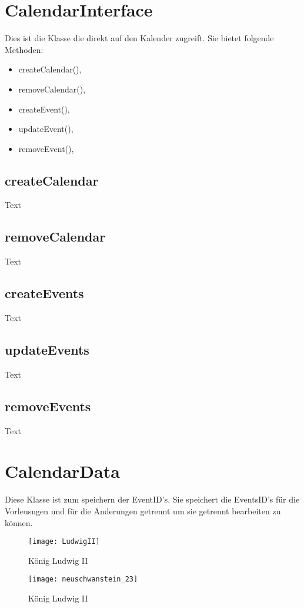 \section{CalendarInterface}
Dies ist die Klasse die direkt auf den Kalender zugreift. Sie bietet folgende Methoden:
\begin{itemize}
     \item createCalendar(),
     \item removeCalendar(),
     \item createEvent(),
     \item updateEvent(),
     \item removeEvent(),
\end{itemize}

\subsection{createCalendar}
Text

\subsection{removeCalendar}
Text

\subsection{createEvents}
Text

\subsection{updateEvents}
Text

\subsection{removeEvents}
Text

\section{CalendarData}
Diese Klasse ist zum speichern der EventID's. Sie speichert die EventsID's für die Vorleusngen und für die Änderungen getrennt um sie getrennt bearbeiten zu können.





\begin{figure}[htb]
    \centering
    \texttt{[image: LudwigII]}
    \caption{König Ludwig II}
\end{figure}


\begin{figure}[htb]
    \centering
    \texttt{[image: neuschwanstein\_23]}
    \caption{König Ludwig II}
\end{figure}

